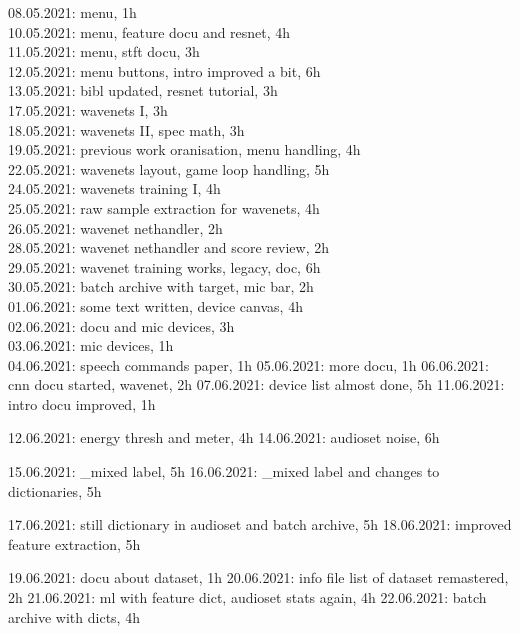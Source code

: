 08.05.2021: menu, 1h\\
10.05.2021: menu, feature docu and resnet, 4h\\
11.05.2021: menu, stft docu, 3h\\
12.05.2021: menu buttons, intro improved a bit, 6h\\

13.05.2021: bibl updated, resnet tutorial, 3h\\
17.05.2021: wavenets I, 3h\\

18.05.2021: wavenets II, spec math, 3h\\
19.05.2021: previous work oranisation, menu handling, 4h\\
22.05.2021: wavenets layout, game loop handling, 5h\\

24.05.2021: wavenets training I, 4h\\
25.05.2021: raw sample extraction for wavenets, 4h\\

26.05.2021: wavenet nethandler, 2h\\
28.05.2021: wavenet nethandler and score review, 2h\\
29.05.2021: wavenet training works, legacy, doc, 6h\\

30.05.2021: batch archive with target, mic bar, 2h\\
01.06.2021: some text written, device canvas, 4h\\
02.06.2021: docu and mic devices, 3h\\
03.06.2021: mic devices, 1h\\

04.06.2021: speech commands paper, 1h
05.06.2021: more docu, 1h
06.06.2021: cnn docu started, wavenet, 2h
07.06.2021: device list almost done, 5h
11.06.2021: intro docu improved, 1h

12.06.2021: energy thresh and meter, 4h
14.06.2021: audioset noise, 6h

15.06.2021: _mixed label, 5h
16.06.2021: _mixed label and changes to dictionaries, 5h

17.06.2021: still dictionary in audioset and batch archive, 5h
18.06.2021: improved feature extraction, 5h

19.06.2021: docu about dataset, 1h
20.06.2021: info file list of dataset remastered, 2h
21.06.2021: ml with feature dict, audioset stats again, 4h
22.06.2021: batch archive with dicts, 4h

